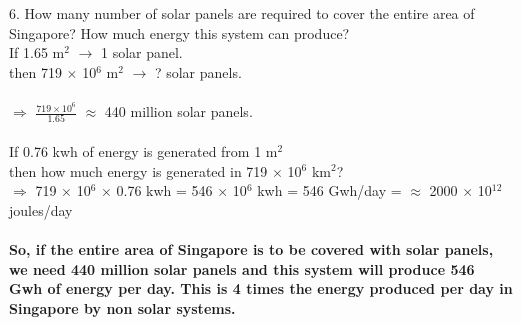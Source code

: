 \documentclass[11pt]{exam}
\begin{document}
\begin{questions}
{\begin{minipage}{42em}
                 6. How many number of solar panels are required to cover the entire area of Singapore? How much energy this system can produce? \\
                   If 1.65 m$^{2}$ $\rightarrow$ 1 solar panel. \\
                   then 719 $\times$ 10$^{6}$ m$^{2}$ $\rightarrow$ ? solar panels. \\ \\
                   $\Rightarrow$ $\frac{719 \times 10^{6}}{1.65}$ $\approx$ 440 million solar panels. \\ \\
                   If 0.76 kwh of energy is generated from 1 m$^{2}$  \\
                   then  how much energy is generated in 719 $\times$ 10$^{6}$ km$^{2}$? \\
                   $\Rightarrow$ 719 $\times$ 10$^{6}$ $\times$ 0.76 kwh = 546 $\times$ 10$^{6}$ kwh = 546 Gwh/day = $\approx$ 2000 $\times$ 10$^{12}$ joules/day  \\ \\
                   
                   \textbf{So, if the entire area of Singapore is to be covered with solar panels, we need 440 million solar panels and this system will produce 546 Gwh of energy per day. This is 4 times the energy produced per day in Singapore by non solar systems.}
                   
\end{minipage}} \\ \\                   
                   




\end{questions}
\end{document}
